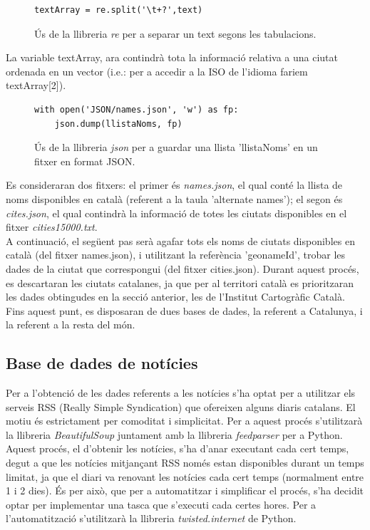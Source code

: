 \documentclass[12pt,a4paper,openright,oneside]{article}
\numberwithin{equation}{section}
\theoremstyle{definition}
\begin{document}
\begin{figure}[!htbp]
\begin{verbatim}
textArray = re.split('\t+?',text)
\end{verbatim}
\caption{Ús de la llibreria \emph{re} per a separar un text segons les tabulacions.}
\end{figure}

La variable textArray, ara contindrà tota la informació relativa a una ciutat ordenada en un vector (i.e.: per a accedir a la ISO de l'idioma fariem textArray[2]).
\begin{figure}[!htbp]
\begin{verbatim}
with open('JSON/names.json', 'w') as fp:
    json.dump(llistaNoms, fp)
\end{verbatim}
\caption{Ús de la llibreria \emph{json} per a guardar una llista 'llistaNoms' en un fitxer en format JSON.}
\end{figure}

Es consideraran dos fitxers: el primer és \emph{names.json}, el qual conté la llista de noms disponibles en català (referent a la taula 'alternate names'); el segon és \emph{cites.json}, el qual contindrà la informació de totes les ciutats disponibles en el fitxer \emph{cities15000.txt}.\\
A continuació, el següent pas serà agafar tots els noms de ciutats disponibles en català (del fitxer names.json), i utilitzant la referència 'geonameId', trobar les dades de la ciutat que correspongui (del fitxer cities.json). Durant aquest procés, es descartaran les ciutats catalanes, ja que per al territori català es prioritzaran les dades obtingudes en la secció anterior, les de l'Institut Cartogràfic Català.\\
Fins aquest punt, es disposaran de dues bases de dades, la referent a Catalunya, i la referent a la resta del món.

\subsection*{Base de dades de notícies}
Per a l'obtenció de les dades referents a les notícies s'ha optat per a utilitzar els serveis RSS (Really Simple Syndication) que ofereixen alguns diaris catalans. El motiu és estrictament per comoditat i simplicitat. Per a aquest procés s'utilitzarà la llibreria \emph{BeautifulSoup} juntament amb  la llibreria \emph{feedparser} per a Python.\\
Aquest procés, el d'obtenir les notícies, s'ha d'anar executant cada cert temps, degut a que les notícies mitjançant RSS només estan disponibles durant un temps limitat, ja que el diari va renovant les notícies cada cert temps (normalment entre 1 i 2 dies). És per això, que per a automatitzar i simplificar el procés, s'ha decidit optar per implementar una tasca que s'executi cada certes hores. Per a l'automatització s'utilitzarà la llibreria \emph{twisted.internet} de Python.\\ \\
\end{document}
